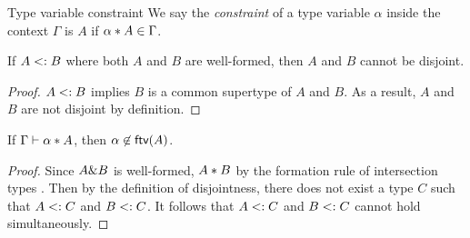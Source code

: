 \begin{definition}{Type variable constraint}
  We say the \emph{constraint} of a type variable $\alpha$ inside the context
  $\Gamma$ is $A$ if $\alpha * A \in \Gamma$.
\end{definition}

\begin{lemma}
If $A <: B$ where both $A$ and $B$ are well-formed, then $A$ and $B$ cannot be disjoint.
\end{lemma}

\begin{proof}
$A <: B$ implies $B$ is a common supertype of $A$ and $B$. As a result, $A$ and $B$ are not disjoint by definition.
\end{proof}


\begin{lemma} \label{free-var-disjoint-bounds}
  If $\Gamma \vdash \alpha * A$, then $\alpha \not \in \textsf{ftv}(A)$.
\end{lemma}

\begin{proof}
Since $A \& B$ is well-formed, $A * B$ by the formation rule of intersection types . Then by the definition of disjointness, there does not exist a type $C$ such that $A <: C$ and $B <: C$. It follows that $A <: C$ and $B <: C$ cannot hold simultaneously.
\end{proof}

